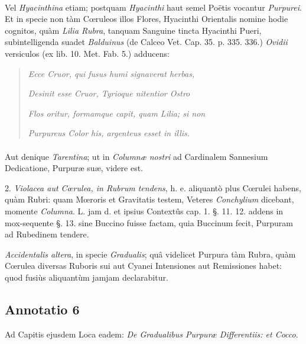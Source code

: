\documentclass[a4paper, 11pt, oneside, polutonikogreek, german]{article}
\begin{document}
\paragraph{}
Vel \emph{Hyacinthina} etiam; postquam \emph{Hyacinthi} haut semel Poëtis vocantur \emph{Purpurei}. Et in specie non tàm Cœruleos illos Flores, Hyacinthi Orientalis nomine hodie cognitos, quàm \emph{Lilia Rubra}, tanquam Sanguine tincta Hyacinthi Pueri, subintelligenda suadet \emph{Balduinus} (de Calceo Vet. Cap. 35. p. 335. 336.) \emph{Ovidii} versiculos (ex lib. 10. Met. Fab. 5.) adducens:
\begin{quotation}
\emph{Ecce Cruor, qui fusus humi signaverat herbas,}

\emph{Desinit esse Cruor, Tyrioque nitentior Ostro}

\emph{Flos oritur, formamque capit, quam Lilia; si non}

\emph{Purpureus Color his, argenteus esset in illis.}
\end{quotation}
\paragraph{}
Aut denique \emph{Tarentina}; ut in \emph{Columnæ nostri} ad Cardinalem Sannesium Dedicatione, Purpuræ suæ, videre est.

2. \emph{Violacea aut Cœrulea, in Rubrum tendens}, h. e. aliquantò plus Cœrulei habens, quàm Rubri: quam Mœroris et Gravitatis testem, Veteres \emph{Conchylium} dicebant, momente \emph{Columna}. L. jam d. et ipsius Contextûs cap. 1. §. 11. 12. addens in mox-sequente §. 13. sine Buccino fuisse factam, quia Buccinum fecit, Purpuram ad Rubedinem tendere.

\emph{Accidentalis altera}, in specie \emph{Gradualis}; quâ videlicet Purpura tàm Rubra, quàm Cœrulea diversas Ruboris sui aut Cyanei Intensiones aut Remissiones habet: quod fusiùs aliquantùm jamjam declarabitur.

\subsection{Annotatio 6}
\begin{center}
Ad Capitis ejusdem Loca eadem: \emph{De Gradualibus Purpuræ Differentiis: et Cocco}.
\end{center}
\end{document}
